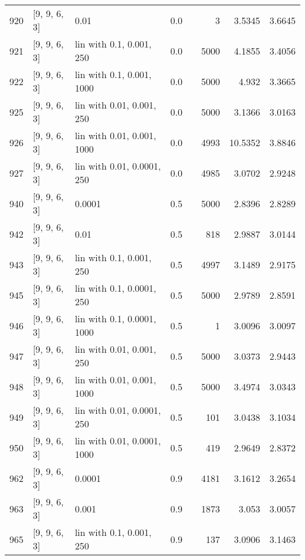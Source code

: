 \begin{longtable}{lllrrrrr}
  920 &       [9, 9, 6, 3] &                        0.01 &      0.0 &     &    3 &   3.5345 &   3.6645 \\
  921 &       [9, 9, 6, 3] &    lin with 0.1, 0.001, 250 &      0.0 &     & 5000 &   4.1855 &   3.4056 \\
  922 &       [9, 9, 6, 3] &   lin with 0.1, 0.001, 1000 &      0.0 &     & 5000 &    4.932 &   3.3665 \\
  925 &       [9, 9, 6, 3] &   lin with 0.01, 0.001, 250 &      0.0 &     & 5000 &   3.1366 &   3.0163 \\
  926 &       [9, 9, 6, 3] &  lin with 0.01, 0.001, 1000 &      0.0 &     & 4993 &  10.5352 &   3.8846 \\
  927 &       [9, 9, 6, 3] &  lin with 0.01, 0.0001, 250 &      0.0 &     & 4985 &   3.0702 &   2.9248 \\
  940 &       [9, 9, 6, 3] &                      0.0001 &      0.5 &     & 5000 &   2.8396 &   2.8289 \\
  942 &       [9, 9, 6, 3] &                        0.01 &      0.5 &     &  818 &   2.9887 &   3.0144 \\
  943 &       [9, 9, 6, 3] &    lin with 0.1, 0.001, 250 &      0.5 &     & 4997 &   3.1489 &   2.9175 \\
  945 &       [9, 9, 6, 3] &   lin with 0.1, 0.0001, 250 &      0.5 &     & 5000 &   2.9789 &   2.8591 \\
  946 &       [9, 9, 6, 3] &  lin with 0.1, 0.0001, 1000 &      0.5 &     &    1 &   3.0096 &   3.0097 \\
  947 &       [9, 9, 6, 3] &   lin with 0.01, 0.001, 250 &      0.5 &     & 5000 &   3.0373 &   2.9443 \\
  948 &       [9, 9, 6, 3] &  lin with 0.01, 0.001, 1000 &      0.5 &     & 5000 &   3.4974 &   3.0343 \\
  949 &       [9, 9, 6, 3] &  lin with 0.01, 0.0001, 250 &      0.5 &     &  101 &   3.0438 &   3.1034 \\
  950 &       [9, 9, 6, 3] & lin with 0.01, 0.0001, 1000 &      0.5 &     &  419 &   2.9649 &   2.8372 \\
  962 &       [9, 9, 6, 3] &                      0.0001 &      0.9 &     & 4181 &   3.1612 &   3.2654 \\
  963 &       [9, 9, 6, 3] &                       0.001 &      0.9 &     & 1873 &    3.053 &   3.0057 \\
  965 &       [9, 9, 6, 3] &    lin with 0.1, 0.001, 250 &      0.9 &     &  137 &   3.0906 &   3.1463 \\

\end{longtable}
